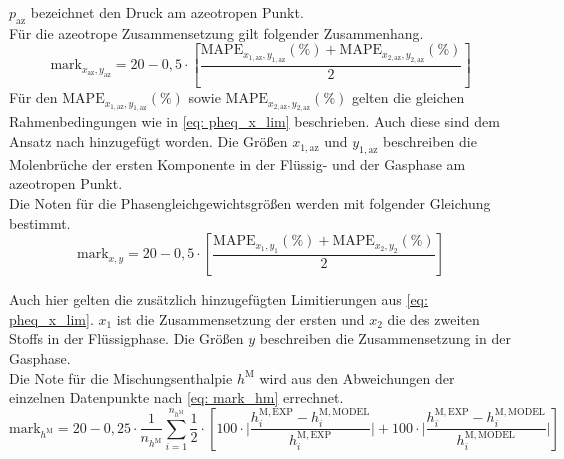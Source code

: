 \documentclass[../thesis.tex]{subfiles}
\begin{document}
$ p_\mathrm{az} $ bezeichnet den Druck am azeotropen Punkt.
\\

Für die azeotrope Zusammensetzung gilt folgender Zusammenhang.
\begin{equation}
\mathrm{mark}_{x_\mathrm{az},y_\mathrm{az}} = 20 - 0,5 \cdot \left[
	\dfrac{\mathrm{MAPE}_{x_{1,\mathrm{az}},y_{1,\mathrm{az}}}(\%) + \mathrm{MAPE}_{x_{2,\mathrm{az}},y_{2,\mathrm{az}}}(\%)}{2}
\right]
\end{equation}
Für den $ \mathrm{MAPE}_{x_{1,\mathrm{az}},y_{1,\mathrm{az}}}(\%) $ sowie $ \mathrm{MAPE}_{x_{2,\mathrm{az}},y_{2,\mathrm{az}}}(\%) $ gelten die gleichen Rahmenbedingungen wie in \autoref{eq: pheq_x_lim} beschrieben. Auch diese sind dem Ansatz nach \cite{jaubert2020benchmark} hinzugefügt worden. Die Größen $ x_{1,\mathrm{az}} $ und $ y_{1,\mathrm{az}} $ beschreiben die Molenbrüche der ersten Komponente in der Flüssig- und der Gasphase am azeotropen Punkt. 
\\

Die Noten für die Phasengleichgewichtsgrößen werden mit folgender Gleichung bestimmt.
\begin{equation}
	\mathrm{mark}_{x,y} = 20 - 0,5 \cdot \left[
		\dfrac{\mathrm{MAPE}_{x_1,y_1}(\%) + \mathrm{MAPE}_{x_2,y_2}(\%)}{2}
	\right]
\end{equation}

Auch hier gelten die zusätzlich hinzugefügten Limitierungen aus \autoref{eq: pheq_x_lim}.
$x_1$ ist die Zusammensetzung der ersten und $x_2$ die des zweiten Stoffs in der Flüssigphase. Die Größen $ y $ beschreiben die Zusammensetzung in der Gasphase.
\\

Die Note für die Mischungsenthalpie $ h^{\mathrm{M}} $ wird aus den Abweichungen der einzelnen Datenpunkte nach \autoref{eq: mark_hm} errechnet.
\begin{equation}
\mathrm{mark}_{h^{\mathrm{M}}} = 20 - 0,25 \cdot \dfrac{1}{n_{h^{\mathrm{M}}}} \sum_{i=1}^{n_{h^{\mathrm{M}}}}
	\dfrac{1}{2} \cdot \left[
		100 \cdot \biggl|
			\dfrac{h_i^{\mathrm{M,EXP}}-h_i^{\mathrm{M,MODEL}}}{h_i^{\mathrm{M,EXP}}} 
			\biggl| 
			+ 100 \cdot \biggl| \dfrac{h_i^{\mathrm{M,EXP}}-h_i^{\mathrm{M,MODEL}}}{h_i^{\mathrm{M,MODEL}}}
		\biggl|
	\right]
\label{eq: mark_hm}
\end{equation}
\end{document}
